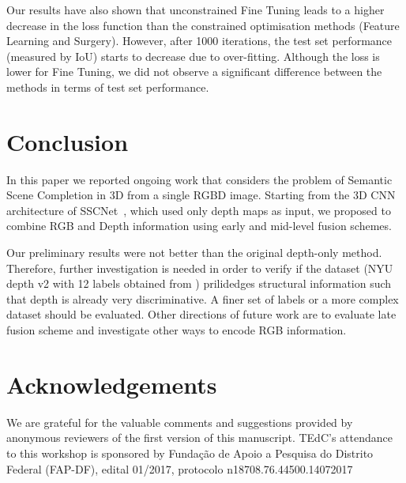 Our results have also shown that unconstrained Fine Tuning
leads to a higher decrease in the loss function than the constrained
optimisation methods (Feature Learning and Surgery). However, after
1000 iterations, the test set performance (measured by IoU) starts
to decrease due to over-fitting.
Although the loss is lower for Fine Tuning, we did not observe a
significant difference between the
methods in terms of test set performance.



































\section{Conclusion}
In this paper we reported ongoing work that 
considers the problem of Semantic Scene Completion in 3D
from a single RGBD image.
Starting from the 3D CNN architecture of
SSCNet~\cite{song_etal_SSCnet_cvpr2017}, which used only
depth maps as input, we proposed to combine RGB and Depth
information using early and mid-level fusion schemes.

Our preliminary results were not better than the original
depth-only method.
Therefore, further investigation is
needed in order to verify if the dataset (NYU depth v2 with
12 labels obtained from \cite{handa_etal_SceneNet_cvpr2016})
prilidedges structural information such that depth is already
very discriminative. A finer set of labels or a more complex
dataset should be evaluated.
Other directions of future work are to evaluate late fusion
scheme and investigate other ways to encode RGB information.


\section{Acknowledgements}

We are grateful for the valuable comments and suggestions
provided by anonymous reviewers of the first version of
this manuscript.
TEdC's attendance to this workshop is sponsored by 
Funda\c{c}\~ao de Apoio a Pesquisa do Distrito Federal (FAP-DF),
edital 01/2017, protocolo n18708.76.44500.14072017
